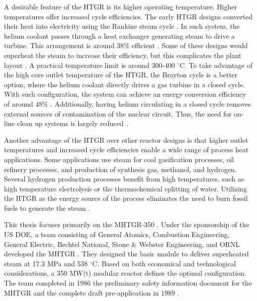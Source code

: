 \documentclass[11pt,letterpaper]{article}
\begin{document}
A desirable feature of the \gls{HTGR} is its higher operating temperature.
Higher temperatures offer increased cycle efficiencies.
The early \gls{HTGR} designs converted their heat into electricity using the Rankine steam cycle \cite{herranz_power_2009}.
In such system, the helium coolant passes through a heat exchanger generating steam to drive a  turbine.
This arrangement is around 38\% efficient \cite{breeze_nuclear_2014}.
Some of these designs would superheat the steam to increase their efficiency, but this complicates the plant layout \cite{ballinger_balance_2004}.
A practical temperature limit is around 300-400 $^{\circ}$C.
To take advantage of the high core outlet temperature of the \gls{HTGR}, the Brayton cycle is a better option, where the helium coolant directly drives a gas turbine in a closed cycle.
With such configuration, the system can achieve an energy conversion efficiency of around 48\% \cite{breeze_nuclear_2014}.
Additionally, having helium circulating in a closed cycle removes external sources of contamination of the nuclear circuit.
Thus, the need for on-line clean up systems is largely reduced \cite{iaea_current_2001}.

Another advantage of the \gls{HTGR} over other reactor designs is that higher outlet temperatures and increased cycle efficiencies enable a wide range of process heat applications.
Some applications use steam for coal gasification processes, oil refinery processes, and  production of synthesis gas, methanol, and hydrogen.
Several hydrogen production processes benefit from high temperatures, such as high temperature electrolysis or the thermochemical splitting of water.
Utilizing the \gls{HTGR} as the energy source of the process eliminates the need to burn fossil fuels to generate the steam \cite{iaea_current_2001}.

This thesis focuses primarily on the \gls{MHTGR}-350 \cite{neylan_modular_1988} \cite{silady_licensing_1988}.
Under the sponsorship of the \gls{US} \gls{DOE}, a team consisting of General Atomics, Combustion Engineering, General Electric, Bechtel National, Stone \& Webster Engineering, and \gls{ORNL} developed the \gls{MHTGR} \cite{neylan_modular_1988}.
They designed the basic module to deliver superheated steam at 17.3 MPa and 538 $^{\circ}$C.
Based on both economical and technological considerations, a 350 MW(t) modular reactor defines the optimal configuration.
The team completed in 1986 the preliminary safety information document for the \gls{MHTGR} and the complete draft pre-application in 1989 \cite{huning_steady_2014}.
\end{document}
